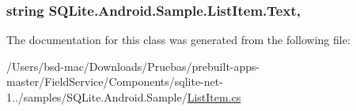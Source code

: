 \hypertarget{class_s_q_lite_1_1_android_1_1_sample_1_1_list_item_a3c2b2b067af15209a65171f377eaba46}{
\subsubsection[{Text}]{\setlength{\rightskip}{0pt plus 5cm}string S\+Q\+Lite.\+Android.\+Sample.\+List\+Item.\+Text\hspace{0.3cm}{\ttfamily [get]}, {\ttfamily [set]}}}\label{class_s_q_lite_1_1_android_1_1_sample_1_1_list_item_a3c2b2b067af15209a65171f377eaba46}


The documentation for this class was generated from the following file\+:\begin{DoxyCompactItemize}
\item 
/\+Users/bsd-\/mac/\+Downloads/\+Pruebas/prebuilt-\/apps-\/master/\+Field\+Service/\+Components/sqlite-\/net-\/1../samples/\+S\+Q\+Lite.\+Android.\+Sample/\hyperlink{_s_q_lite_8_android_8_sample_2_list_item_8cs}{List\+Item.\+cs}\end{DoxyCompactItemize}
